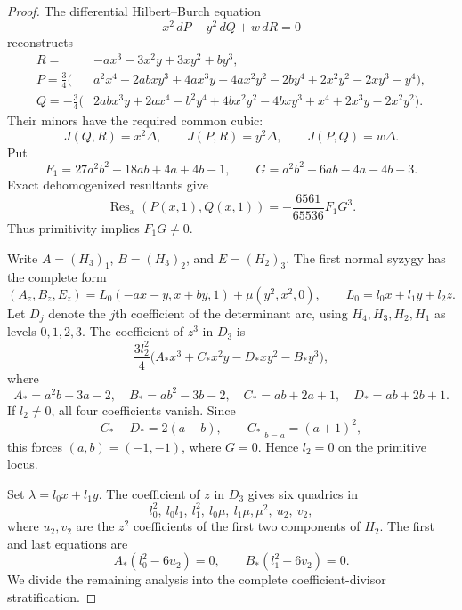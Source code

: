 \begin{proof}
The differential Hilbert--Burch equation
\[
 x^2\,dP-y^2\,dQ+w\,dR=0
\]
reconstructs
\begin{align*}
 R={}&-ax^3-3x^2y+3xy^2+by^3,\\
 P=\frac34\bigl(&a^2x^4-2abxy^3+4ax^3y-4ax^2y^2
                    -2by^4+2x^2y^2-2xy^3-y^4\bigr),\\
 Q=-\frac34\bigl(&2abx^3y+2ax^4-b^2y^4+4bx^2y^2-4bxy^3
                    +x^4+2x^3y-2x^2y^2\bigr).
\end{align*}
Their minors have the required common cubic:
\[
 J(Q,R)=x^2\Delta,\qquad J(P,R)=y^2\Delta,
 \qquad J(P,Q)=w\Delta.
\]
Put
\[
 F_1=27a^2b^2-18ab+4a+4b-1,
 \qquad
 G=a^2b^2-6ab-4a-4b-3.
\]
Exact dehomogenized resultants give
\[
 \operatorname{Res}_x(P(x,1),Q(x,1))
   =-\frac{6561}{65536}F_1G^3.
\]
Thus primitivity implies $F_1G\ne0$.

Write $A=(H_3)_1$, $B=(H_3)_2$, and $E=(H_2)_3$.  The first normal
syzygy has the complete form
\begin{equation}
\label{eq:tau-minus-one-first-normal}
 (A_z,B_z,E_z)
 =L_0(-ax-y,x+by,1)+\mu(y^2,x^2,0),
 \qquad L_0=l_0x+l_1y+l_2z.
\end{equation}
Let $D_j$ denote the $j$th coefficient of the determinant arc, using
$H_4,H_3,H_2,H_1$ as levels $0,1,2,3$.  The coefficient of $z^3$ in
$D_3$ is
\[
 \frac{3l_2^2}{4}\bigl(
 A_*x^3+C_*x^2y-D_*xy^2-B_*y^3\bigr),
\]
where
\[
 A_*=a^2b-3a-2,\quad B_*=ab^2-3b-2,
 \quad C_*=ab+2a+1,\quad D_*=ab+2b+1.
\]
If $l_2\ne0$, all four coefficients vanish.  Since
\[
 C_*-D_*=2(a-b),\qquad C_*\big|_{b=a}=(a+1)^2,
\]
this forces $(a,b)=(-1,-1)$, where $G=0$.  Hence $l_2=0$ on the
primitive locus.

Set $\lambda=l_0x+l_1y$.  The coefficient of $z$ in $D_3$ gives six
quadrics in
\[
 l_0^2,\ l_0l_1,\ l_1^2,\ l_0\mu,\ l_1\mu,\mu^2,\ u_2,\ v_2,
\]
where $u_2,v_2$ are the $z^2$ coefficients of the first two components
of $H_2$.  The first and last equations are
\[
 A_*(l_0^2-6u_2)=0,\qquad
 B_*(l_1^2-6v_2)=0.
\]
We divide the remaining analysis into the complete coefficient-divisor
stratification.


\end{proof}
